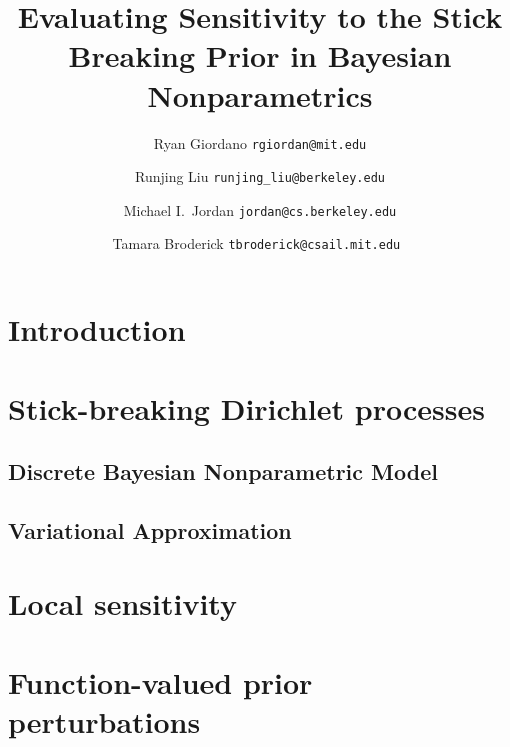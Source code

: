 \documentclass[11pt]{article}
\begin{document}



\title{Evaluating Sensitivity to the Stick Breaking Prior in Bayesian Nonparametrics}

\author{Ryan Giordano \texttt{rgiordan@mit.edu} \\
        \and
        Runjing Liu \texttt{runjing\_liu@berkeley.edu} \\
        \and
        Michael I.\ Jordan \texttt{jordan@cs.berkeley.edu} \\
        \and
        Tamara Broderick \texttt{tbroderick@csail.mit.edu }
        }

\maketitle

\begin{abstract}%

\end{abstract}


\section{Introduction}



\section{Stick-breaking Dirichlet processes}
    \subsection{Discrete Bayesian Nonparametric Model}
    

    \subsection{Variational Approximation}
    


\section{Local sensitivity}


\section{Function-valued prior perturbations}

\end{document}
